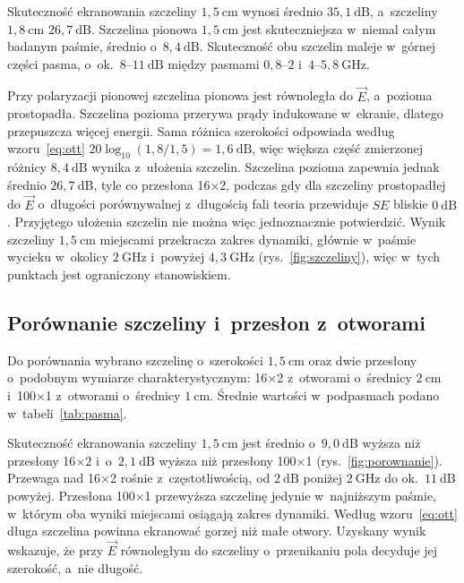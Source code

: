 \documentclass[11pt,a4paper]{article}
\begin{document}
Skuteczność ekranowania szczeliny $1{,}5\ \mathrm{cm}$ wynosi średnio $35{,}1\ \mathrm{dB}$,
a~szczeliny $1{,}8\ \mathrm{cm}$ $26{,}7\ \mathrm{dB}$. Szczelina pionowa $1{,}5\ \mathrm{cm}$ jest
skuteczniejsza w~niemal całym badanym paśmie, średnio o~$8{,}4\ \mathrm{dB}$. Skuteczność obu
szczelin maleje w~górnej części pasma, o~ok.~$8$--$11\ \mathrm{dB}$ między pasmami
$0{,}8$--$2$ i~$4$--$5{,}8\ \mathrm{GHz}$.

Przy polaryzacji pionowej szczelina pionowa jest równoległa do $\vec E$, a~pozioma
prostopadła. Szczelina pozioma przerywa prądy indukowane w~ekranie, dlatego przepuszcza więcej
energii. Sama różnica szerokości odpowiada według wzoru~\eqref{eq:ott}
$20\log_{10}(1{,}8/1{,}5) = 1{,}6\ \mathrm{dB}$, więc większa część zmierzonej różnicy
$8{,}4\ \mathrm{dB}$ wynika z~ułożenia szczelin. Szczelina pozioma zapewnia jednak średnio
$26{,}7\ \mathrm{dB}$, tyle co przesłona 16$\times$2, podczas gdy dla szczeliny prostopadłej
do $\vec E$ o~długości porównywalnej z~długością fali teoria przewiduje $SE$ bliskie
$0\ \mathrm{dB}$. Przyjętego ułożenia szczelin nie można więc jednoznacznie potwierdzić.
Wynik szczeliny $1{,}5\ \mathrm{cm}$ miejscami przekracza
zakres dynamiki, głównie w~paśmie wycieku w~okolicy $2\ \mathrm{GHz}$ i~powyżej
$4{,}3\ \mathrm{GHz}$ (rys.~\ref{fig:szczeliny}), więc w~tych punktach jest ograniczony
stanowiskiem.

\subsection{Porównanie szczeliny i~przesłon z~otworami}
\label{sec:el4}

Do porównania wybrano szczelinę o~szerokości $1{,}5\ \mathrm{cm}$ oraz dwie przesłony
o~podobnym wymiarze charakterystycznym: 16$\times$2 z~otworami o~średnicy $2\ \mathrm{cm}$
i~100$\times$1 z~otworami o~średnicy $1\ \mathrm{cm}$. Średnie wartości w~podpasmach podano
w~tabeli~\ref{tab:pasma}.

Skuteczność ekranowania szczeliny $1{,}5\ \mathrm{cm}$ jest średnio o~$9{,}0\ \mathrm{dB}$
wyższa niż przesłony 16$\times$2 i~o~$2{,}1\ \mathrm{dB}$ wyższa niż przesłony 100$\times$1 (rys.~\ref{fig:porownanie}). Przewaga nad 16$\times$2 rośnie
z~częstotliwością, od $2\ \mathrm{dB}$ poniżej $2\ \mathrm{GHz}$ do ok.~$11\ \mathrm{dB}$ powyżej.
Przesłona 100$\times$1 przewyższa szczelinę jedynie w~najniższym paśmie, w~którym oba wyniki
miejscami osiągają zakres dynamiki. Według wzoru~\eqref{eq:ott} długa szczelina powinna
ekranować gorzej niż małe otwory. Uzyskany wynik wskazuje, że przy $\vec E$ równoległym do
szczeliny o~przenikaniu pola decyduje jej szerokość, a~nie długość.
\end{document}
